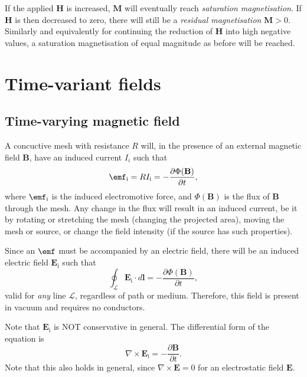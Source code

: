 \documentclass[a4paper, 12pt]{article}
\renewcommand{\vec}[1]{\mathbf{#1}}
\newcommand{\E}{\ensuremath{\vec{E}}}
\newcommand{\B}{\ensuremath{\vec{B}}}
\renewcommand{\H}{\ensuremath{\vec{H}}}
\begin{document}
            If the applied \H{} is increased, $\vec{M}$ will eventually reach \textit{saturation magnetisation}. 
            If \H{} is then decreased to zero, there will still be a \textit{residual magnetisation} $\vec{M} > 0$. 
            Similarly and equivalently for continuing the reduction of \H{} into high negative values, 
            a saturation magnetisation of equal magnitude as before will be reached.

        
\section{Time-variant fields}
    \subsection{Time-varying magnetic field}
        A concuctive mesh with resistance $R$ will, in the presence of an external magnetic field \B, 
        have an induced current $I_i$ such that
        \begin{equation}
            \emf_\text{i} = RI_\text{i} = -\frac{\partial \Phi(\B)}{\partial t},
        \end{equation}
        where $\emf_\text{i}$ is the induced electromotive force, and $\Phi(\B)$ is the flux of \B{} through the mesh. 
        Any change in the flux will result in an induced current, 
        be it by rotating or stretching the mesh (changing the projected area),
        moving the mesh or source, or change the field intensity (if the source has such properties).

        Since an $\emf$ must be accompanied by an electric field, 
        there will be an induced electric field $\E_\text{i}$ such that
        \begin{equation}
            \oint_\mathcal{L}\E_\text{i}\cdot d\vec{l} = -\frac{\partial \Phi(\B)}{\partial t},
        \end{equation}
        valid for \textit{any} line $\mathcal{L}$, regardless of path or medium. 
        Therefore, this field is present in vacuum and requires no conductors.

        Note that $\E_\text{i}$ is NOT conservative in general. The differential form of the equation is
        \begin{equation}
            \nabla \times \E_\text{i} = -\frac{\partial \B}{\partial t}.
        \end{equation}
        Note that this also holds in general, since $\nabla\times\E = 0$ for an electrostatic field \E.
\end{document}

